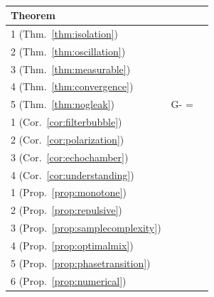 \documentclass[11pt,a4paper]{article}
\theoremstyle{remark}
\begin{document}
\begin{table}[H]
\centering
\begin{tabular}{lll}
\toprule
\textbf{Theorem} & \textbf{} & \textbf{} \\
\midrule
 1 (Thm.~\ref{thm:isolation}) &  & \pageref{thm:isolation} \\
 2 (Thm.~\ref{thm:oscillation}) &  & \pageref{thm:oscillation} \\
 3 (Thm.~\ref{thm:measurable}) &  & \pageref{thm:measurable} \\
 4 (Thm.~\ref{thm:convergence}) &  & \pageref{thm:convergence} \\
 5 (Thm.~\ref{thm:nogleak}) & G- =  & \pageref{thm:nogleak} \\
\hline
 1 (Cor.~\ref{cor:filterbubble}) &  & \pageref{cor:filterbubble} \\
 2 (Cor.~\ref{cor:polarization}) &  & \pageref{cor:polarization} \\
 3 (Cor.~\ref{cor:echochamber}) &  & \pageref{cor:echochamber} \\
 4 (Cor.~\ref{cor:understanding}) &  & \pageref{cor:understanding} \\
\hline
 1 (Prop.~\ref{prop:monotone}) &  & \pageref{prop:monotone} \\
 2 (Prop.~\ref{prop:repulsive}) &  & \pageref{prop:repulsive} \\
 3 (Prop.~\ref{prop:samplecomplexity}) &  & \pageref{prop:samplecomplexity} \\
 4 (Prop.~\ref{prop:optimalmix}) &  & \pageref{prop:optimalmix} \\
 5 (Prop.~\ref{prop:phasetransition}) &  & \pageref{prop:phasetransition} \\
 6 (Prop.~\ref{prop:numerical}) &  & \pageref{prop:numerical} \\
\bottomrule
\end{tabular}
\caption{}
\end{table}
\end{document}
